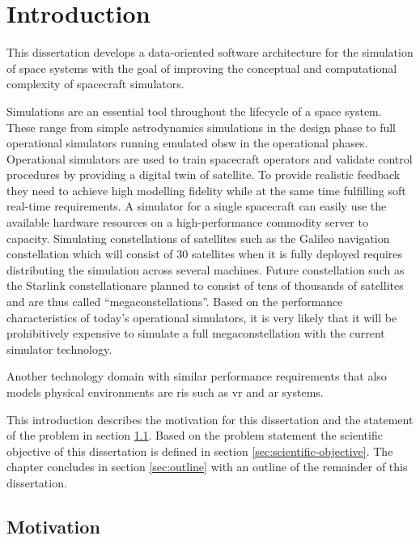 \chapter{Introduction}
\label{sec:introduction}
This dissertation develops a data-oriented software architecture for the simulation of space systems with the goal of improving the conceptual and computational complexity of spacecraft simulators.

Simulations are an essential tool throughout the lifecycle of a space system.
These range from simple astrodynamics simulations in the design phase to full operational simulators running emulated \ac{obsw} in the operational phases.
Operational simulators are used to train spacecraft operators and validate control procedures by providing a digital twin of satellite.
To provide realistic feedback they need to achieve high modelling fidelity while at the same time fulfilling soft real-time requirements.
A simulator for a single spacecraft can easily use the available hardware resources on a high-performance commodity server to capacity.
Simulating constellations of satellites such as the Galileo navigation constellation which will consist of 30 satellites when it is fully deployed requires distributing the simulation across several machines.\citeme
Future constellation such as the Starlink constellation\citeme are planned to consist of tens of thousands of satellites and are thus called \enquote{megaconstellations}.
Based on the performance characteristics of today's operational simulators, it is very likely that it will be prohibitively expensive to simulate a full megaconstellation with the current simulator technology.

Another technology domain with similar performance requirements that also models physical environments are \ac{ris} such as \ac{vr} and \ac{ar} systems.


This introduction describes the motivation for this dissertation and the statement of the problem in section \ref{sec:motivation}.
Based on the problem statement the scientific objective of this dissertation is defined in section \ref{sec:scientific-objective}.
The chapter concludes in section \ref{sec:outline} with an outline of the remainder of this dissertation.

\section{Motivation}
\label{sec:motivation}


